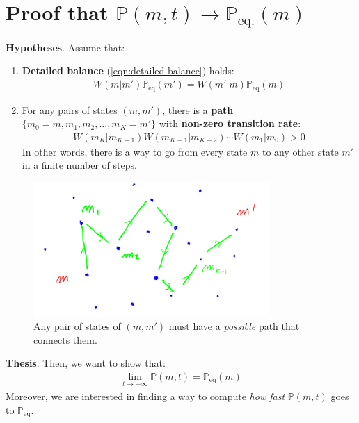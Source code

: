 \documentclass[../../main.tex]{subfiles}
\begin{document}
\section{Proof that $\mathbb{P}(m,t) \to \mathbb{P}_{\mathrm{eq.}}(m)$}\label{sec:proof-db}

\textbf{Hypotheses}. 
Assume that:
\begin{enumerate}
    \item \textbf{Detailed balance} (\ref{eqn:detailed-balance}) holds:
    \begin{align}\label{eqn:hyp-db1}
        {W(m|m') \mathbb{P}_{\mathrm{eq}}(m')} = {W(m'|m) \mathbb{P}_{\mathrm{eq}}(m)} 
    \end{align}
    \item For any pairs of states $(m,m')$, there is a \textbf{path} $\{m_0 = m, m_1, m_2, \dots, m_K = m'\}$ with \textbf{non-zero transition rate}:
    \begin{align}\label{eqn:hyp-2}
        W(m_K|m_{K-1}) W(m_{K-1}|m_{K-2}) \cdots W(m_1|m_0) > 0
    \end{align}
    In other words, there is a way to go from every state $m$ to any other state $m'$ in a finite number of steps. 
\end{enumerate}
\begin{figure}[H]
    \centering
    \includegraphics[width=0.8\textwidth]{path_existance.png}
    \caption{Any pair of states of $(m,m')$ must have a \textit{possible} path that connects them.}
    \label{fig:path_existance}
\end{figure}
\textbf{Thesis}. 
Then, we want to show that:
\begin{align*}
    \lim_{t \to +\infty} \mathbb{P}(m,t) = \mathbb{P}_{\mathrm{eq}}(m)
\end{align*}
Moreover, we are interested in finding a way to compute \textit{how fast} $\mathbb{P}(m,t)$ goes to $\mathbb{P}_{\mathrm{eq}}$.
\end{document}
